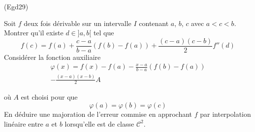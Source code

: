 \begin{tiny}(Egd29)\end{tiny} Soit $f$ deux fois dérivable sur un intervalle $I$ contenant $a$, $b$, $c$ avec $a<c<b$. Montrer qu'il existe $d\in ]a,b[$ tel que
\begin{displaymath}
 f(c) = f(a) +\frac{c-a}{b-a}\left( f(b)-f(a)\right)+\frac{(c-a)(c-b)}{2}f''(d) 
\end{displaymath}
Considérer la fonction auxiliaire
\begin{multline*}
 \varphi(x) = f(x) -f(a) -\frac{x-a}{b-a}\left( f(b)-f(a)\right)\\
-\frac{(x-a)(x-b)}{2}A
\end{multline*}

où $A$ est choisi pour que 
\begin{displaymath}
 \varphi(a) = \varphi(b) = \varphi(c)
\end{displaymath}
En déduire une majoration de l'erreur commise en approchant $f$ par interpolation linéaire entre $a$ et $b$ lorsqu'elle est de classe $\mathcal{C}^2$.
